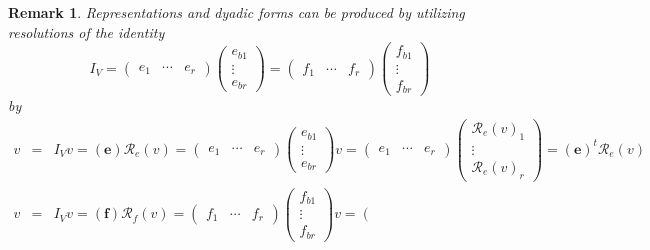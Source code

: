 \documentclass[aps,preprint]{revtex4}
\newtheorem{remark}[theorem]{Remark}
\begin{document}
\begin{remark}
Representations and dyadic forms can be produced by utilizing resolutions of
the identity%
\begin{equation}
I_{V}=\left( 
\begin{array}{ccc}
e_{1} & \cdots & e_{r}%
\end{array}%
\right) \left( 
\begin{array}{c}
e_{b1} \\ 
\vdots \\ 
e_{br}%
\end{array}%
\right) =\left( 
\begin{array}{ccc}
f_{1} & \cdots & f_{r}%
\end{array}%
\right) \left( 
\begin{array}{c}
f_{b1} \\ 
\vdots \\ 
f_{br}%
\end{array}%
\right)
\end{equation}
by 
\begin{eqnarray}
v &=&I_{V}v=\left( \boldsymbol{e}\right) \mathcal{R}_{e}\left( v\right)
=\left( 
\begin{array}{ccc}
e_{1} & \cdots & e_{r}%
\end{array}%
\right) \left( 
\begin{array}{c}
e_{b1} \\ 
\vdots \\ 
e_{br}%
\end{array}%
\right) v=\left( 
\begin{array}{ccc}
e_{1} & \cdots & e_{r}%
\end{array}%
\right) \left( 
\begin{array}{c}
\mathcal{R}_{e}\left( v\right) _{1} \\ 
\vdots \\ 
\mathcal{R}_{e}\left( v\right) _{r}%
\end{array}%
\right) =\left( \boldsymbol{e}\right) ^{t}\mathcal{R}_{e}\left( v\right) \\
v &=&I_{V}v=\left( \boldsymbol{f}\right) \mathcal{R}_{f}\left( v\right)
=\left( 
\begin{array}{ccc}
f_{1} & \cdots & f_{r}%
\end{array}%
\right) \left( 
\begin{array}{c}
f_{b1} \\ 
\vdots \\ 
f_{br}%
\end{array}%
\right) v=\left( 
\begin{array}{ccc}

\end{array}
\end{eqnarray}
\end{remark}
\end{document}
